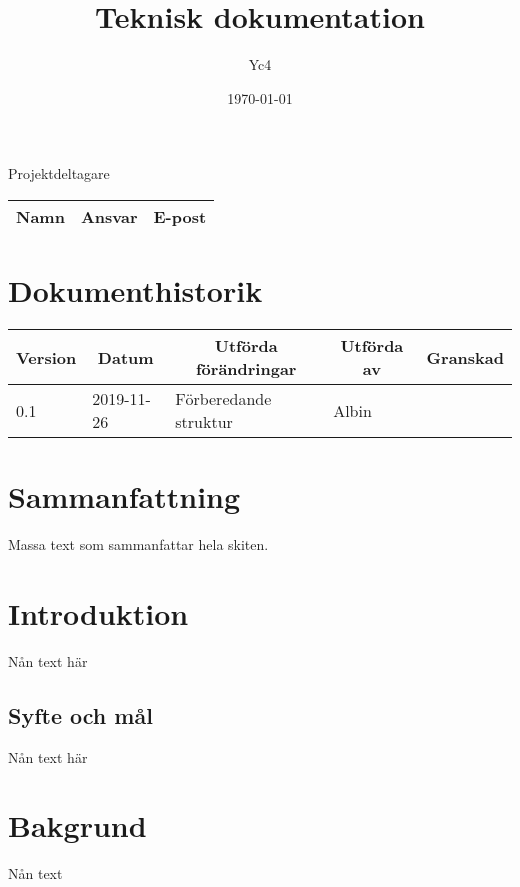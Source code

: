 \documentclass[10pt,oneside,swedish]{lips-no_customer}
\title{Teknisk dokumentation}
\author{Yc4}
\date{\today}
\begin{document}
\maketitle

\cleardoublepage
\makeprojectid

\begin{center}
  \Large Projektdeltagare
\end{center}
\begin{center}
  \begin{tabular}{|l|l|l|}
    \hline
    \textbf{Namn} & \textbf{Ansvar} & \textbf{E-post}\\
    \hline
  \end{tabular}
\end{center}

\section*{Dokumenthistorik}
\begin{tabular}{p{}|p{}|p{}|p{}|p{}} 
  \multicolumn{1}{c}{\bfseries Version} & 
  \multicolumn{1}{|c}{\bfseries Datum} & 
  \multicolumn{1}{|c}{\bfseries Utförda förändringar} & 
  \multicolumn{1}{|c}{\bfseries Utförda av} & 
  \multicolumn{1}{|c}{\bfseries Granskad}\\
  \hline
  \hline
  0.1 & 2019-11-26 & Förberedande struktur & Albin & \\
  \hline
\end{tabular}

\cleardoublepage
{}\cfoot{\thepage}
\section*{Sammanfattning}
Massa text som sammanfattar hela skiten.

\cleardoublepage
\tableofcontents
\cleardoublepage

\section{Introduktion}
Nån text här
\subsection{Syfte och mål}
Nån text här
\section{Bakgrund}
Nån text
\end{document}
